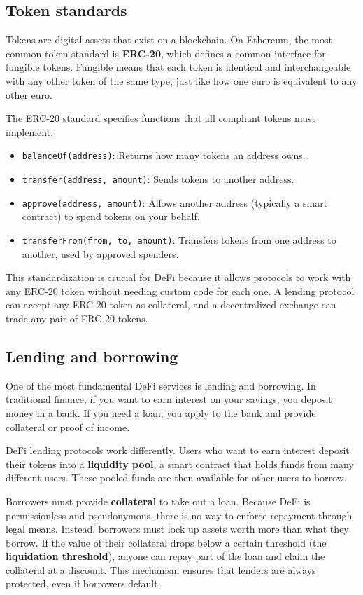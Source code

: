 \subsection{Token standards}

Tokens are digital assets that exist on a blockchain. On Ethereum, the most common token standard is \textbf{ERC-20}, which defines a common interface for fungible tokens. Fungible means that each token is identical and interchangeable with any other token of the same type, just like how one euro is equivalent to any other euro.

The ERC-20 standard specifies functions that all compliant tokens must implement:

\begin{itemize}
    \item \texttt{balanceOf(address)}: Returns how many tokens an address owns.
    \item \texttt{transfer(address, amount)}: Sends tokens to another address.
    \item \texttt{approve(address, amount)}: Allows another address (typically a smart contract) to spend tokens on your behalf.
    \item \texttt{transferFrom(from, to, amount)}: Transfers tokens from one address to another, used by approved spenders.
\end{itemize}

This standardization is crucial for DeFi because it allows protocols to work with any ERC-20 token without needing custom code for each one. A lending protocol can accept any ERC-20 token as collateral, and a decentralized exchange can trade any pair of ERC-20 tokens.

\subsection{Lending and borrowing}

One of the most fundamental DeFi services is lending and borrowing. In traditional finance, if you want to earn interest on your savings, you deposit money in a bank. If you need a loan, you apply to the bank and provide collateral or proof of income.

DeFi lending protocols work differently. Users who want to earn interest deposit their tokens into a \textbf{liquidity pool}, a smart contract that holds funds from many different users. These pooled funds are then available for other users to borrow.

Borrowers must provide \textbf{collateral} to take out a loan. Because DeFi is permissionless and pseudonymous, there is no way to enforce repayment through legal means. Instead, borrowers must lock up assets worth more than what they borrow. If the value of their collateral drops below a certain threshold (the \textbf{liquidation threshold}), anyone can repay part of the loan and claim the collateral at a discount. This mechanism ensures that lenders are always protected, even if borrowers default.

